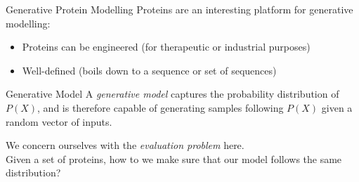 \documentclass[aspectratio=169, 10pt, dvipsnames]{beamer}
\begin{document}
\begin{frame}[fragile]{Generative Protein Modelling}
  Proteins are an interesting platform for generative modelling:
  \begin{itemize}
  \pause \item Proteins can be engineered (for therapeutic or industrial purposes)
  \pause \item Well-defined (boils down to a sequence or set of sequences)
\end{itemize}
\pause
  \begin{alert}{Generative Model}
    A \emph{generative model} captures the probability distribution of $P(X)$, and is
    therefore capable of generating samples following  $P(X)$ given a random
    vector of inputs.
  \end{alert}

  \pause We concern ourselves with the \emph{evaluation problem} here.\\
  \pause Given a set of proteins, how to we make sure that our model follows the same
  distribution?
  \begin{figure}
    \centering
\end{figure}
\end{frame}
\end{document}
